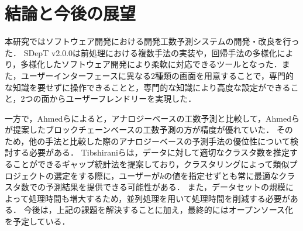 \section{結論と今後の展望}\label{sec:5}
本研究ではソフトウェア開発における開発工数予測システムの開発・改良を行った．
SDepT v2.0.0は前処理における複数手法の実装や，回帰手法の多様化により，多様化したソフトウェア開発により柔軟に対応できるツールとなった．また，ユーザーインターフェースに異なる2種類の画面を用意することで，専門的な知識を要せずに操作できることと，専門的な知識により高度な設定ができること，2つの面からユーザーフレンドリーを実現した．

一方で，Ahmedら\cite{Ahmed2022}によると，アナロジーベースの工数予測と比較して，Ahmedらが提案したブロックチェーンベースの工数予測の方が精度が優れていた．
そのため，他の手法と比較した際のアナロジーベースの予測手法の優位性について検討する必要がある．
Tibshiraniら\cite{Tibshirani2000}は，データに対して適切なクラスタ数を推定することができるギャップ統計法を提案しており，クラスタリングによって類似プロジェクトの選定をする際に，ユーザーが$k$の値を指定せずとも常に最適なクラスタ数での予測結果を提供できる可能性がある．
また，データセットの規模によって処理時間も増大するため，並列処理を用いて処理時間を削減する必要がある．
今後は，上記の課題を解決することに加え，最終的にはオープンソース化を予定している．